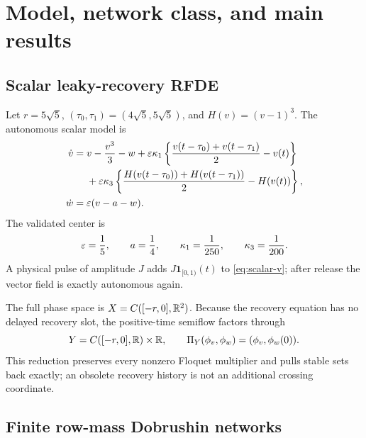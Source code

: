 \section{Model, network class, and main results}\label{sec:model-results}

\subsection{Scalar leaky-recovery RFDE}

Let \(r=5\sqrt5\), \((\tau_0,\tau_1)=(4\sqrt5,5\sqrt5)\), and
\(H(v)=(v-1)^3\).  The autonomous scalar model is
\begin{align}
 \dot v={}&v-\frac{v^3}{3}-w
 +\varepsilon\kappa_1\left\{\frac{v(t-\tau_0)+v(t-\tau_1)}2-v(t)\right\}
 \notag\\
 &+\varepsilon\kappa_3\left\{
 \frac{H(v(t-\tau_0))+H(v(t-\tau_1))}{2}-H(v(t))\right\},\label{eq:scalar-v}\\
 \dot w={}&\varepsilon(v-a-w).\label{eq:scalar-w}
\end{align}
The validated center is
\begin{equation}
 \varepsilon=\frac15,\qquad a=\frac14,\qquad
 \kappa_1=\frac1{250},\qquad \kappa_3=\frac1{200}.       \label{eq:center}
\end{equation}
A physical pulse of amplitude \(J\) adds
\(J\mathbf1_{[0,1)}(t)\) to \cref{eq:scalar-v}; after release the vector
field is exactly autonomous again.

The full phase space is
\(X=C([-r,0],\mathbb R^2)\).  Because the recovery equation has no delayed recovery
slot, the positive-time semiflow factors through
\begin{equation}
 Y=C([-r,0],\mathbb R)\times\mathbb R,\qquad
 \Pi_Y(\phi_v,\phi_w)=(\phi_v,\phi_w(0)).               \label{eq:reduced-space}
\end{equation}
This reduction preserves every nonzero Floquet multiplier and pulls stable
sets back exactly; an obsolete recovery history is not an additional
crossing coordinate.

\subsection{Finite row-mass Dobrushin networks}

